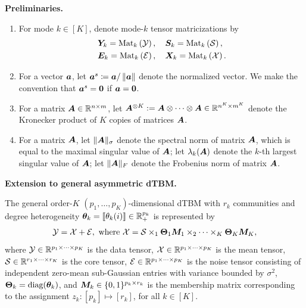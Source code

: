 \documentclass[journal]{IEEEtran}
\theoremstyle{definition}
\theoremstyle{definition}
\newcommand{\of}[1]{\left(#1\right)}
\begin{document}
{\bf Preliminaries.}
\begin{enumerate}[wide]
    \item For mode $ k \in [K]$, denote mode-$k$ tensor matricizations by
    \begin{align}
        &\mY_k = \mat_k \of{ \tY }, \quad \mS_k = \mat_k \of{\tS}, \\ &\mE_k = \mat_k \of{ \tE}, \quad \mX_k = \mat_k \of{\tX}.
    \end{align}
    \item For a vector $\bm{a}$, let $\bm{a}^{s} \coloneqq \bm{a}/\left\lVert\bm{a}\right\rVert$ denote the normalized vector. We make the convention that $\bm{a}^s = {\bf 0}$ if $\bm{a} = {\bf 0}$. 
    \item For a matrix $\bm A \in \mathbb{R}^{n \times m} $, let $\bm A^{\otimes K}:=\bm A\otimes \cdots \otimes \bm A\in \mathbb{R}^{n^K \times m^K}$ denote the Kronecker product of $K$ copies of matrices $\bm A $.
    \item For a matrix $\bm A$, let $\lVert\bm A\rVert_\sigma$ denote the spectral norm of matrix $\bm A$, which is equal to the maximal singular value of $\bm A$; let $\lambda_k(\bm A)$ denote the $k$-th largest singular value of $\bm A$; let $\lVert\bm A\rVert_F$ denote the Frobenius norm of matrix $\bm A$.
\end{enumerate}

{\bf Extension to general asymmetric dTBM.} 
 
 The general order-$K$ $(p_1, \ldots, p_K)$-dimensional dTBM with $r_k$ communities and degree heterogeneity $\boldsymbol{\theta}_k = \llbracket \theta_k(i) \rrbracket \in \mathbb{R}_+^{p_k}$ is represented by
\begin{equation}\label{eq:general_dtbm}
    \tY = \tX+ \tE, \ \text{where}\ \tX=\tS \times_1 \mTheta_1 \mM_1 \times_2 \cdots \times_K \mTheta_K \mM_K,
\end{equation}
where $\mathcal{Y} \in \mathbb{R}^{p_1 \times \cdots \times p_K}$ is the data tensor, $\mathcal{X}\in \mathbb{R}^{p_1\times \cdots \times p_K}$ is the mean tensor, $\mathcal{S} \in \mathbb{R}^{r_1 \times \cdots \times r_K}$ is the core tensor, $\mathcal{E} \in \mathbb{R}^{p_1 \times \cdots \times p_K}$ is the noise tensor consisting of independent zero-mean sub-Gaussian entries with variance bounded by $\sigma^2$, $\boldsymbol{\Theta}_k = \text{diag}(\boldsymbol{\theta}_k)$, and $\bm M_k\in \{0,1\}^{p_k \times r_k}$ is the membership matrix corresponding to the assignment $z_k: [p_k] \mapsto [r_k]$, for all $k \in [K]$. 
\end{document}
